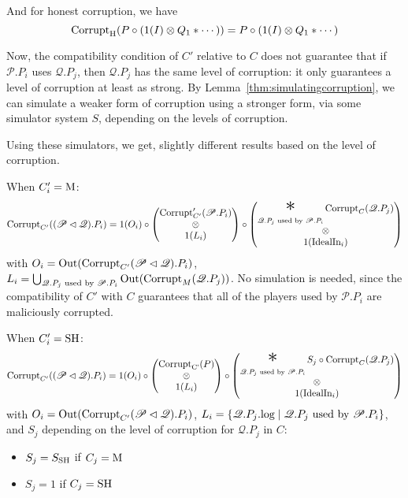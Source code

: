 \begin{theorem}
And for honest corruption, we have
$$
\text{Corrupt}_{\text{H}}(P \circ (1(I) \otimes Q_1 * \cdots)) = P \circ (1(I) \otimes Q_1 * \cdots)
$$

Now, the compatibility condition of $C'$ relative to $C$
does not guarantee that if $\mathscr{P}.P_i$ uses $\mathscr{Q}.P_j$,
then $\mathscr{Q}.P_j$ has the same level of corruption: 
it only guarantees a level of corruption at least as strong.
By Lemma~\ref{thm:simulatingcorruption}, we can simulate a weaker
form of corruption using a stronger form, via some simulator system $S$,
depending on the levels of corruption.

Using these simulators, we get, slightly different results based
on the level of corruption.

When $C'_i = \text{M}$:
$$
\tx{Corrupt}_{C'}((\mathscr{P} \lhd \mathscr{Q}).P_i) =
1(O_i) \circ
\begin{pmatrix}
  \tx{Corrupt}'_{C'}(\mathscr{P}.P_i)\cr
  \otimes\cr
  1(L_i)\cr
\end{pmatrix}
\circ
\begin{pmatrix}
\displaystyle \bigast_{\mathscr{Q}.P_j \tx{ used by } \mathscr{P}.P_i}
  \tx{Corrupt}_C(\mathscr{Q}.P_j)\cr
\otimes\cr
1(\tx{IdealIn}_i)
\end{pmatrix}
$$
with $O_i = \text{Out}(\text{Corrupt}_{C'}(\mathscr{P} \lhd \mathscr{Q}).P_i)$, $L_i= \bigcup_{\mathscr{Q}.P_j \text{ used by } \mathscr{P}.P_i} \text{Out}(\text{Corrupt}_M(\mathscr{Q}.P_j))$.
No simulation is needed, since the compatibility of $C'$ with $C$
guarantees that all of the players used by $\mathscr{P}.P_i$
are maliciously corrupted.

When $C'_i = \text{SH}$:
$$
\tx{Corrupt}_{C'}((\mathscr{P} \lhd \mathscr{Q}).P_i) =
1(O_i) \circ
\begin{pmatrix}
  \tx{Corrupt}_{\tx{C'}}(P)\cr
  \otimes\cr
  1(L_i)
\end{pmatrix}
\circ
\begin{pmatrix}
\displaystyle \bigast_{\mathscr{Q}.P_j \tx{ used by } \mathscr{P}.P_i}
  S_j \circ \tx{Corrupt}_C(\mathscr{Q}.P_j)\cr
  \otimes\cr
1(\tx{IdealIn}_i)
\end{pmatrix}
$$
with $O_i = \text{Out}(\text{Corrupt}_{C'}(\mathscr{P} \lhd \mathscr{Q}).P_i)$,
$L_i = \{\mathscr{Q}.P_j.\text{log} \mid \mathscr{Q}.P_j \text{ used by } \mathscr{P}.P_i \}$,
and $S_j$ depending on the level of corruption for $\mathscr{Q}.P_j$ in $C$:
\begin{itemize}
  \item $S_j = S_{\text{SH}}$ if $C_j = \text{M}$
  \item $S_j = 1$ if $C_j = \text{SH}$
\end{itemize}


\end{theorem}

